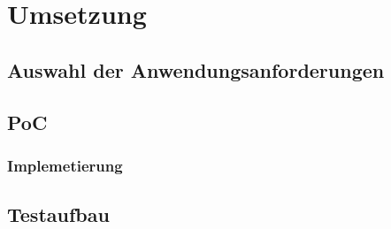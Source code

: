 \chapter{Umsetzung}
\label{ch:implementation}
\lipsum[1-1]

%
%
\section{Auswahl der Anwendungsanforderungen}
\label{sec:implementation:selection}
\lipsum[1-1]

%
%
\section{PoC}
\label{sec:implementation:poc}
\lipsum[1-1]


\subsection{Implemetierung}
\label{subsec:implementation:poc:implementation}
\lipsum[1-1]

\section{Testaufbau}
\label{subsec:implementation:poc:testing}
\lipsum[1-1]
